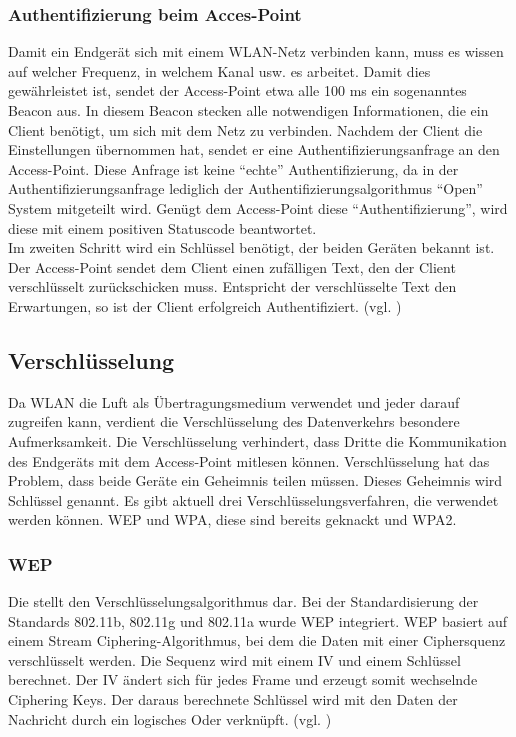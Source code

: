 \subsubsection{Authentifizierung beim Acces-Point}
Damit ein Endgerät sich mit einem WLAN-Netz verbinden kann, muss es wissen auf welcher Frequenz, in welchem Kanal usw. es arbeitet. Damit dies gewährleistet ist, sendet der Access-Point etwa alle 100 ms ein sogenanntes Beacon aus. In diesem Beacon stecken alle notwendigen Informationen, die ein Client benötigt, um sich mit dem Netz zu verbinden. Nachdem der Client die Einstellungen übernommen hat, sendet er eine Authentifizierungsanfrage an den Access-Point. Diese Anfrage ist keine "`echte"' Authentifizierung, da in der Authentifizierungsanfrage lediglich der Authentifizierungsalgorithmus "`Open"' System mitgeteilt wird. Genügt dem Access-Point diese "`Authentifizierung"', wird diese mit einem positiven Statuscode beantwortet.\\
Im zweiten Schritt wird ein Schlüssel benötigt, der beiden Geräten bekannt ist. Der Access-Point sendet dem Client einen zufälligen Text, den der Client verschlüsselt zurückschicken muss. Entspricht der verschlüsselte Text den Erwartungen, so ist der Client erfolgreich Authentifiziert. (vgl. \cite{SWB-430171331})


\subsection{Verschlüsselung}
Da WLAN die Luft als Übertragungsmedium verwendet und jeder darauf zugreifen kann, verdient die Verschlüsselung des Datenverkehrs besondere Aufmerksamkeit. Die Verschlüsselung verhindert, dass Dritte die Kommunikation des Endgeräts mit dem Access-Point mitlesen können. Verschlüsselung hat das Problem, dass beide Geräte ein Geheimnis teilen müssen. Dieses Geheimnis wird Schlüssel genannt. Es gibt aktuell drei Verschlüsselungsverfahren, die verwendet werden können. \ac{WEP} und \ac{WPA}, diese sind bereits geknackt und \ac{WPA2}.
\subsubsection{\ac{WEP}}
Die  stellt den Verschlüsselungsalgorithmus dar.
Bei der Standardisierung der Standards 802.11b, 802.11g und 802.11a wurde \ac{WEP} integriert. \ac{WEP} basiert auf einem Stream Ciphering-Algorithmus, bei dem die Daten mit einer Ciphersquenz verschlüsselt werden. Die Sequenz wird mit einem \ac{IV} und einem Schlüssel berechnet. Der \ac{IV} ändert sich für jedes Frame und erzeugt somit wechselnde Ciphering Keys. Der daraus berechnete Schlüssel wird mit den Daten der Nachricht durch ein logisches Oder verknüpft. (vgl. \cite{SWB-430171331})



